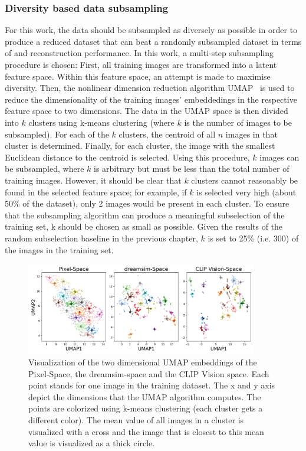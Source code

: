 \subsubsection{Diversity based data subsampling}

For this work, the data should be subsampled as diversely as possible in order to produce a reduced dataset that can beat a randomly subsampled dataset in terms of  and reconstruction performance. In this work, a multi-step subsampling procedure is chosen: First, all training images are transformed into a latent feature space. Within this feature space, an attempt is made to maximise diversity. Then, the nonlinear dimension reduction algorithm UMAP~\cite{mcinnesUMAPUniformManifold2018} is used to reduce the dimensionality of the training images' embeddedings in the respective feature space to two dimensions. The data in the UMAP space is then divided into $k$ clusters using k-means clustering (where $k$ is the number of images to be subsampled). For each of the $k$ clusters, the centroid of all $n$ images in that cluster is determined. Finally, for each cluster, the image with the smallest Euclidean distance to the centroid is selected. Using this procedure, $k$ images can be subsampled, where $k$ is arbitrary but must be less than the total number of training images. However, it should be clear that $k$ clusters cannot reasonably be found in the selected feature space; for example, if $k$ is selected very high (about 50\% of the dataset), only 2 images would be present in each cluster. To ensure that the subsampling algorithm can produce a meaningful subselection of the training set, k should be chosen as small as possible. Given the results of the random subselection baseline in the previous chapter, $k$ is set to 25\% (i.e. 300) of the images in the training set. 

\begin{figure}[ht]
    \centering
    \includegraphics[width=0.9\textwidth]{plots/dropout_umap.png}
    \caption[UMAP visualization of diversity based subsampling]{Visualization of the two dimensional UMAP embeddings of the Pixel-Space, the dreamsim-space and the CLIP Vision space. Each point stands for one image in the training dataset. The x and y axis depict the dimensions that the UMAP algorithm computes. The points are colorized using k-means clustering (each cluster gets a different color). The mean value of all images in a cluster is visualized with a cross and the image that is closest to this mean value is visualized as a thick circle.}\label{fig:dropout_umap}
\end{figure}


